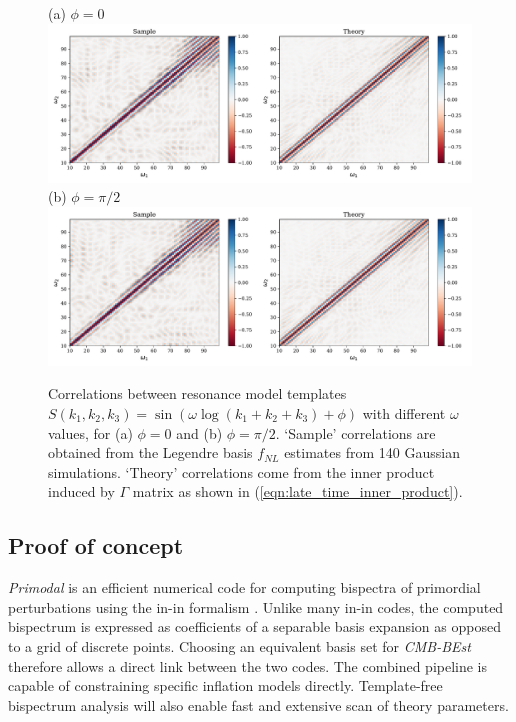 \begin{figure}[htbp!] 
	\centering
	(a) $ \phi=0 $
	\includegraphics[width=\textwidth]{sinlog_template_correlations_new.pdf}
	(b) $ \phi=\pi/2 $
	\includegraphics[width=\textwidth]{coslog_template_correlations_new.pdf}
	\caption{Correlations between resonance model templates $S(k_1,k_2,k_3) = \sin(\omega\log(k_1+k_2+k_3)+\phi)$ with different $\omega$ values, for (a) $\phi = 0$ and (b) $\phi=\pi/2$. `Sample' correlations are obtained from the Legendre basis $f_{NL}$ estimates from 140 Gaussian simulations. `Theory' correlations come from the inner product induced by $\Gamma$ matrix as shown in (\ref{eqn:late_time_inner_product}).}
	\label{fig:sinlog_template_correlations}
\end{figure}


\subsection{Proof of concept} \label{section:proof_of_concept}


\textit{Primodal} is an efficient numerical code for computing bispectra of primordial perturbations using the in-in formalism \cite{Clarke2021}. Unlike many in-in codes, the computed bispectrum is expressed as coefficients of a separable basis expansion as opposed to a grid of discrete points. Choosing an equivalent basis set for \textit{CMB-BEst} therefore allows a direct link between the two codes. The combined pipeline is capable of constraining specific inflation models directly. Template-free bispectrum analysis will also enable fast and extensive scan of theory parameters. 

